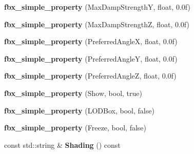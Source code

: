 \begin{DoxyCompactItemize}
\item 
\hypertarget{class_assimp_1_1_f_b_x_1_1_model_a6dbb122ac237af6dd4f2337fb1f83fe0}{{\bfseries fbx\+\_\+simple\+\_\+property} (Max\+Damp\+Strength\+Y, float, 0.\+0f)}\label{class_assimp_1_1_f_b_x_1_1_model_a6dbb122ac237af6dd4f2337fb1f83fe0}

\item 
\hypertarget{class_assimp_1_1_f_b_x_1_1_model_ab082abab52d9a22069ec6b80850f734e}{{\bfseries fbx\+\_\+simple\+\_\+property} (Max\+Damp\+Strength\+Z, float, 0.\+0f)}\label{class_assimp_1_1_f_b_x_1_1_model_ab082abab52d9a22069ec6b80850f734e}

\item 
\hypertarget{class_assimp_1_1_f_b_x_1_1_model_aed9bf896673e3e3b3f36de673ccba661}{{\bfseries fbx\+\_\+simple\+\_\+property} (Preferred\+Angle\+X, float, 0.\+0f)}\label{class_assimp_1_1_f_b_x_1_1_model_aed9bf896673e3e3b3f36de673ccba661}

\item 
\hypertarget{class_assimp_1_1_f_b_x_1_1_model_a84a5c2c8dacbad1b2a0c896ce658c4ed}{{\bfseries fbx\+\_\+simple\+\_\+property} (Preferred\+Angle\+Y, float, 0.\+0f)}\label{class_assimp_1_1_f_b_x_1_1_model_a84a5c2c8dacbad1b2a0c896ce658c4ed}

\item 
\hypertarget{class_assimp_1_1_f_b_x_1_1_model_aded5a2db429fdaf6833c6c387d4aef15}{{\bfseries fbx\+\_\+simple\+\_\+property} (Preferred\+Angle\+Z, float, 0.\+0f)}\label{class_assimp_1_1_f_b_x_1_1_model_aded5a2db429fdaf6833c6c387d4aef15}

\item 
\hypertarget{class_assimp_1_1_f_b_x_1_1_model_ab8d16e082c587b6bfe042f63b8435af8}{{\bfseries fbx\+\_\+simple\+\_\+property} (Show, bool, true)}\label{class_assimp_1_1_f_b_x_1_1_model_ab8d16e082c587b6bfe042f63b8435af8}

\item 
\hypertarget{class_assimp_1_1_f_b_x_1_1_model_a017b9422c8517896fd28c106cdbddf7f}{{\bfseries fbx\+\_\+simple\+\_\+property} (L\+O\+D\+Box, bool, false)}\label{class_assimp_1_1_f_b_x_1_1_model_a017b9422c8517896fd28c106cdbddf7f}

\item 
\hypertarget{class_assimp_1_1_f_b_x_1_1_model_a5f16673973816389518542cd712af4f7}{{\bfseries fbx\+\_\+simple\+\_\+property} (Freeze, bool, false)}\label{class_assimp_1_1_f_b_x_1_1_model_a5f16673973816389518542cd712af4f7}

\item 
\hypertarget{class_assimp_1_1_f_b_x_1_1_model_a5fced4de15e90d6f78e804a7896b2dab}{const std\+::string \& {\bfseries Shading} () const }\label{class_assimp_1_1_f_b_x_1_1_model_a5fced4de15e90d6f78e804a7896b2dab}


\end{DoxyCompactItemize}
